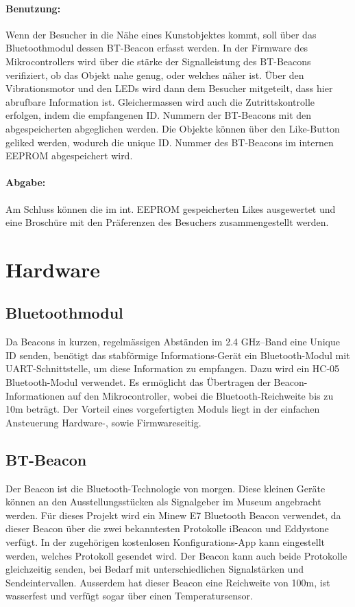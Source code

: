\paragraph*{Benutzung:}
Wenn der Besucher in die Nähe eines Kunstobjektes kommt, soll über das Bluetoothmodul dessen BT-Beacon erfasst werden. In der Firmware des Mikrocontrollers wird über die stärke der Signalleistung des BT-Beacons verifiziert, ob das Objekt nahe genug, oder welches näher ist. Über den Vibrationsmotor und den LEDs wird dann dem Besucher mitgeteilt, dass hier abrufbare Information ist. Gleichermassen wird auch die Zutrittskontrolle erfolgen, indem die empfangenen ID. Nummern der BT-Beacons mit den abgespeicherten abgeglichen werden. Die Objekte können über den Like-Button geliked werden, wodurch die unique ID. Nummer des BT-Beacons im internen EEPROM abgespeichert wird.
\paragraph*{Abgabe:}
Am Schluss können die im int. EEPROM gespeicherten Likes ausgewertet und eine Broschüre mit den Präferenzen des Besuchers zusammengestellt werden.
\section{Hardware}
\subsection{Bluetoothmodul}
Da Beacons in kurzen, regelmässigen Abständen im 2.4 GHz–Band eine Unique ID senden, benötigt das stabförmige Informations-Gerät ein Bluetooth-Modul mit UART-Schnittstelle, um diese Information zu empfangen. Dazu wird ein HC-05 Bluetooth-Modul verwendet. Es ermöglicht das Übertragen der Beacon-Informationen auf den Mikrocontroller, wobei die Bluetooth-Reichweite bis zu 10m beträgt. Der Vorteil eines vorgefertigten Moduls liegt in der einfachen Ansteuerung Hardware-, sowie Firmwareseitig.

\subsection{BT-Beacon}
Der Beacon ist die Bluetooth-Technologie von morgen. Diese kleinen Geräte können an den Ausstellungsstücken als Signalgeber im Museum angebracht werden. Für dieses Projekt wird ein Minew E7 Bluetooth Beacon verwendet, da dieser Beacon über die zwei bekanntesten Protokolle iBeacon und Eddystone verfügt. In der zugehörigen kostenlosen Konfigurations-App kann eingestellt werden, welches Protokoll gesendet wird. Der Beacon kann auch beide Protokolle gleichzeitig senden, bei Bedarf mit unterschiedlichen Signalstärken und Sendeintervallen. Ausserdem hat dieser Beacon eine Reichweite von 100m, ist wasserfest und verfügt sogar über einen Temperatursensor.
